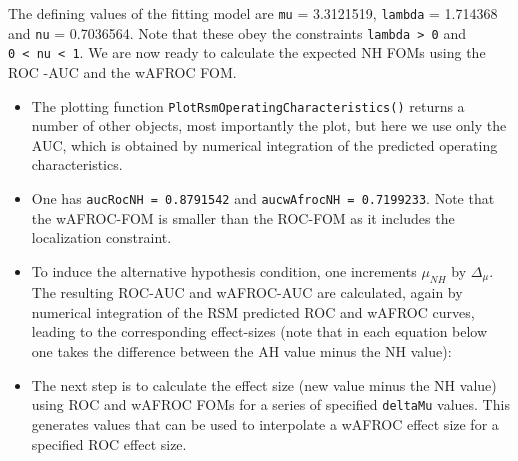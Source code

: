 \documentclass[
]{book}
\newenvironment{Shaded}{\begin{snugshade}}{\end{snugshade}}
\newcommand{\DataTypeTok}[1]{\textcolor[rgb]{0.13,0.29,0.53}{#1}}
\newcommand{\KeywordTok}[1]{\textcolor[rgb]{0.13,0.29,0.53}{\textbf{#1}}}
\newcommand{\NormalTok}[1]{#1}
\newcommand{\OperatorTok}[1]{\textcolor[rgb]{0.81,0.36,0.00}{\textbf{#1}}}
\newcommand{\StringTok}[1]{\textcolor[rgb]{0.31,0.60,0.02}{#1}}
\begin{document}
The defining values of the fitting model are \texttt{mu} = 3.3121519, \texttt{lambda} = 1.714368 and \texttt{nu} = 0.7036564. Note that these obey the constraints \texttt{lambda\ \textgreater{}\ 0} and \texttt{0\ \textless{}\ nu\ \textless{}\ 1}. We are now ready to calculate the expected NH FOMs using the ROC -AUC and the wAFROC FOM.

\begin{Shaded}
\end{Shaded}

\begin{itemize}
\item
  The plotting function \texttt{PlotRsmOperatingCharacteristics()} returns a number of other objects, most importantly the plot, but here we use only the AUC, which is obtained by numerical integration of the predicted operating characteristics.
\item
  One has \texttt{aucRocNH\ =\ 0.8791542} and \texttt{aucwAfrocNH\ =\ 0.7199233}. Note that the wAFROC-FOM is smaller than the ROC-FOM as it includes the localization constraint.
\item
  To induce the alternative hypothesis condition, one increments \(\mu_{NH}\) by \(\Delta_{\mu}\). The resulting ROC-AUC and wAFROC-AUC are calculated, again by numerical integration of the RSM predicted ROC and wAFROC curves, leading to the corresponding effect-sizes (note that in each equation below one takes the difference between the AH value minus the NH value):
\item
  The next step is to calculate the effect size (new value minus the NH value) using ROC and wAFROC FOMs for a series of specified \texttt{deltaMu} values. This generates values that can be used to interpolate a wAFROC effect size for a specified ROC effect size.
\end{itemize}
\end{document}
